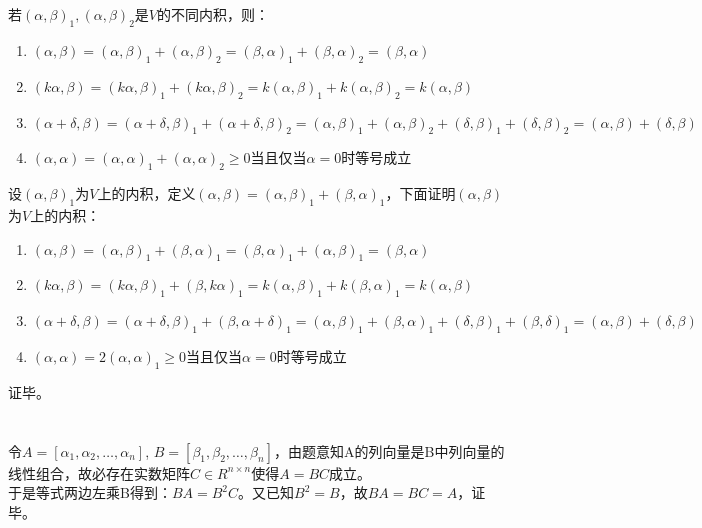 \documentclass{article}
\begin{document}
\section{}
若$ (\alpha,\beta)_1,(\alpha,\beta)_2 $是$ V $的不同内积，则：
\begin{enumerate}[1)]
	\item $ (\alpha,\beta)=(\alpha,\beta)_1+(\alpha,\beta)_2 = (\beta,\alpha)_1+(\beta,\alpha)_2 =(\beta,\alpha) $
	\item $ (k\alpha,\beta)=(k\alpha,\beta)_1+(k\alpha,\beta)_2 = k(\alpha,\beta)_1+k(\alpha,\beta)_2 =k(\alpha,\beta) $
	\item $ (\alpha+\delta,\beta)=(\alpha+\delta,\beta)_1+(\alpha+\delta,\beta)_2 = (\alpha,\beta)_1+(\alpha,\beta)_2 +(\delta,\beta)_1+(\delta,\beta)_2=(\alpha,\beta)+(\delta,\beta) $
	\item $ (\alpha,\alpha) =(\alpha,\alpha)_1+(\alpha,\alpha)_2\ge 0 $当且仅当$ \alpha=0 $时等号成立
\end{enumerate}
设$ (\alpha,\beta)_1 $为$ V $上的内积，定义$ (\alpha,\beta)=(\alpha,\beta)_1+(\beta,\alpha)_1 $，下面证明$ (\alpha,\beta) $为$ V $上的内积：
\begin{enumerate}[1)]
	\item $ (\alpha,\beta)=(\alpha,\beta)_1+(\beta,\alpha)_1 = (\beta,\alpha)_1+(\alpha,\beta)_1 =(\beta,\alpha) $
	\item $ (k\alpha,\beta)=(k\alpha,\beta)_1+(\beta,k\alpha)_1 = k(\alpha,\beta)_1+k(\beta,\alpha)_1 =k(\alpha,\beta) $
	\item $ (\alpha+\delta,\beta)=(\alpha+\delta,\beta)_1+(\beta,\alpha+\delta)_1 = (\alpha,\beta)_1+(\beta,\alpha)_1 +(\delta,\beta)_1+(\beta,\delta)_1=(\alpha,\beta)+(\delta,\beta) $
	\item $ (\alpha,\alpha) =2(\alpha,\alpha)_1\ge 0 $当且仅当$ \alpha=0 $时等号成立
\end{enumerate}
证毕。

\section{}
令$ A=[\alpha_1,\alpha_2,\dots,\alpha_n]$, $B=[\beta_1,\beta_2,\dots,\beta_n] $，由题意知A的列向量是B中列向量的线性组合，故必存在实数矩阵$ C\in R^{n\times n} $使得$ A=BC $成立。\\
于是等式两边左乘B得到：$ BA=B^2C $。又已知$B^2=B$，故$ BA=BC=A $，证毕。
\end{document}
